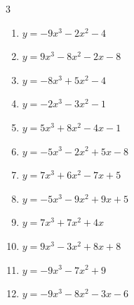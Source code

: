 \begin{multicols}{3}
\begin{enumerate}

  \item $y=-9x^{3}-2x^{2}-4$


  \item $y=9x^{3}-8x^{2}-2x-8$


  \item $y=-8x^{3}+5x^{2}-4$


  \item $y=-2x^{3}-3x^{2}-1$


  \item $y=5x^{3}+8x^{2}-4x-1$


  \item $y=-5x^{3}-2x^{2}+5x-8$


  \item $y=7x^{3}+6x^{2}-7x+5$


\columnbreak %

  \item $y=-5x^{3}-9x^{2}+9x+5$


  \item $y=7x^{3}+7x^{2}+4x$


  \item $y=9x^{3}-3x^{2}+8x+8$


  \item $y=-9x^{3}-7x^{2}+9$


  \item $y=-9x^{3}-8x^{2}-3x-6$



\end{enumerate}
\end{multicols}
